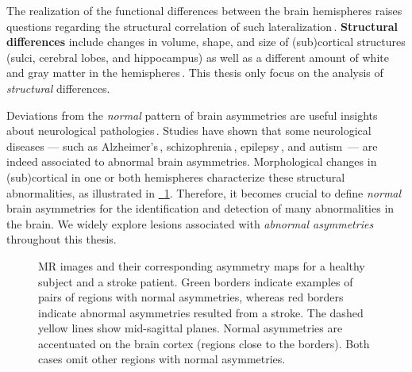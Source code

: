 The realization of the functional differences between the brain hemispheres raises questions regarding the structural correlation of such lateralization\,\cite{Hugdahl-2010-Book-TheTwoHalves}. \textbf{Structural differences} include changes in volume, shape, and size of (sub)cortical structures (\eg sulci, cerebral lobes, and hippocampus) as well as a different amount of white and gray matter in the hemispheres\,\cite{Hugdahl-2010-Book-TheTwoHalves,Amunts-2010-StructuralAsymmetries}. This thesis only focus on the analysis of \emph{structural} differences.

Deviations from the \emph{normal} pattern of brain asymmetries are useful insights about neurological pathologies\,\cite{Wolard-2012-anatomicalHippocampalAsymmetry}. Studies have shown that some neurological diseases --- such as Alzheimer's\,\cite{Convit-1997-Neuro}, schizophrenia\,\cite{Csernansky-2004-Psychiatry,Wang-2001-Neuro}, epilepsy\,\cite{Farid-2012-Radio,Bernasconi-2003-Brain,Yasuda-2010-Neuro-Epilepsy}, and autism\,\cite{Lotspeich-1993-Autism} --- are indeed associated to abnormal brain asymmetries. Morphological changes in (sub)cortical in one or both hemispheres characterize these structural abnormalities, as illustrated in \hyperref[fig:brain_asymmetry_examples]{\fig~\ref{fig:brain_asymmetry_examples}}. Therefore, it becomes crucial to define \emph{normal} brain asymmetries for the identification and detection of many abnormalities in the brain. We widely explore lesions associated with \emph{abnormal asymmetries} throughout this thesis. 

\begin{figure}[!ht]
    \centering
    
    \caption[Examples of normal and abnormal brain asymmetries.]{MR images and their corresponding asymmetry maps for  a healthy subject and  a stroke patient. Green borders indicate examples of pairs of regions with normal asymmetries, whereas red borders indicate abnormal asymmetries resulted from a stroke. The dashed yellow lines show mid-sagittal planes. Normal asymmetries are accentuated on the brain cortex (regions close to the borders). Both cases omit other regions with normal asymmetries. }
    \label{fig:brain_asymmetry_examples}
\end{figure}




